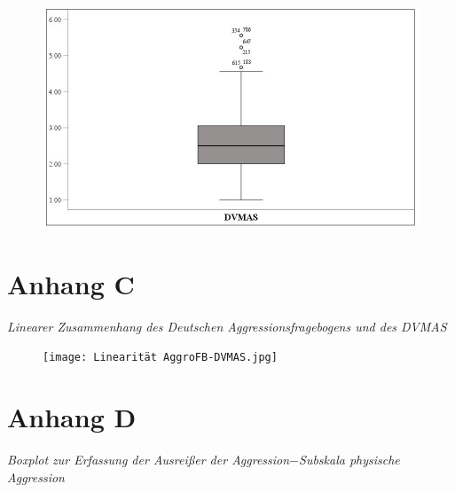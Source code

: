 \begin{appendices}
    \begin{figure}[htb!]
        \centering
            \includegraphics[width=\textwidth]{Boxplot DVMAS.jpg}

    \end{figure}
    
    


\chapter*{Anhang C} \label{Linearitat_AggroFB_DVMAS}
\noindent \textit{Linearer Zusammenhang des Deutschen Aggressionsfragebogens und des DVMAS}

\begin{figure}[htb!]
    \centering
        \texttt{[image: Linearität AggroFB-DVMAS.jpg]}
        
\end{figure}
    
    


    \chapter*{Anhang D}            \label{Boxplot_phAggro}
    \noindent \textit{Boxplot zur Erfassung der Ausreißer der Aggression$-$Subskala physische Aggression}


\end{appendices}
